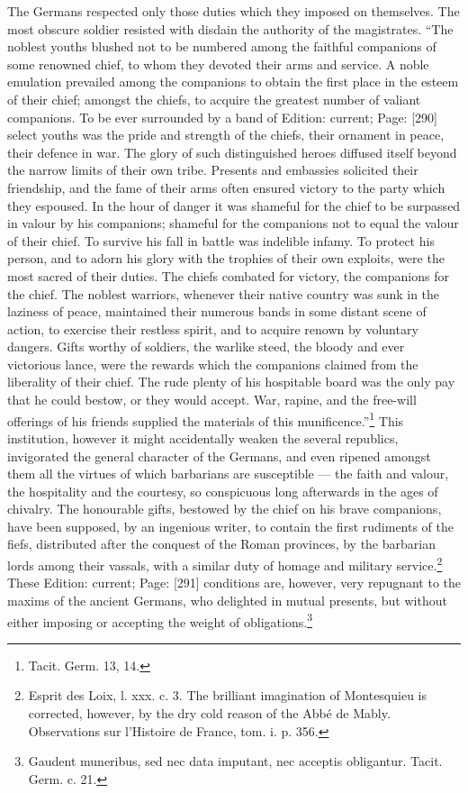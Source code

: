The Germans respected only those duties which they imposed on themselves. The most obscure soldier resisted with disdain the authority of the magistrates. \texthebrew{“}The noblest youths blushed not to be numbered among the faithful companions of some renowned chief, to whom they devoted their arms and service. A noble emulation prevailed among the companions to obtain the first place in the esteem of their chief; amongst the chiefs, to acquire the greatest number of valiant companions. To be ever surrounded by a band of Edition: current; Page: [290] select youths was the pride and strength of the chiefs, their ornament in peace, their defence in war. The glory of such distinguished heroes diffused itself beyond the narrow limits of their own tribe. Presents and embassies solicited their friendship, and the fame of their arms often ensured victory to the party which they espoused. In the hour of danger it was shameful for the chief to be surpassed in valour by his companions; shameful for the companions not to equal the valour of their chief. To survive his fall in battle was indelible infamy. To protect his person, and to adorn his glory with the trophies of their own exploits, were the most sacred of their duties. The chiefs combated for victory, the companions for the chief. The noblest warriors, whenever their native country was sunk in the laziness of peace, maintained their numerous bands in some distant scene of action, to exercise their restless spirit, and to acquire renown by voluntary dangers. Gifts worthy of soldiers, the warlike steed, the bloody and ever victorious lance, were the rewards which the companions claimed from the liberality of their chief. The rude plenty of his hospitable board was the only pay that he could bestow, or they would accept. War, rapine, and the free-will offerings of his friends supplied the materials of this munificence.\texthebrew{}”\footnote{Tacit. Germ. 13, 14.} This institution, however it might accidentally weaken the several republics, invigorated the general character of the Germans, and even ripened amongst them all the virtues of which barbarians are susceptible \texthebrew{—} the faith and valour, the hospitality and the courtesy, so conspicuous long afterwards in the ages of chivalry. The honourable gifts, bestowed by the chief on his brave companions, have been supposed, by an ingenious writer, to contain the first rudiments of the fiefs, distributed after the conquest of the Roman provinces, by the barbarian lords among their vassals, with a similar duty of homage and military service.\footnote{Esprit des Loix, l. xxx. c. 3. The brilliant imagination of Montesquieu is corrected, however, by the dry cold reason of the Abbé de Mably. Observations sur l\texthebrew{}’Histoire de France, tom. i. p. 356.} These Edition: current; Page: [291] conditions are, however, very repugnant to the maxims of the ancient Germans, who delighted in mutual presents, but without either imposing or accepting the weight of obligations.\footnote{Gaudent muneribus, sed nec data imputant, nec acceptis obligantur. Tacit. Germ. c. 21.}


